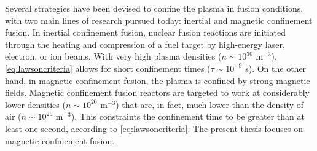 Several strategies have been devised to confine the plasma in fusion conditions, with two main lines of research pursued today: inertial and magnetic confinement fusion.
%
In inertial confinement fusion, nuclear fusion reactions are initiated through the heating and compression of a fuel target by high-energy laser, electron, or ion beams.
%
With very high plasma densities ($n \sim 10^{30}$ m$^{-3}$), \cref{eq:lawsoncriteria} allows for short confinement times ($\tau \sim 10^{-9}$ s).
%
On the other hand, in magnetic confinement fusion, the plasma is confined by strong magnetic fields.
%
Magnetic confinement fusion reactors are targeted to work at considerably lower densities ($n\sim 10^{20}$ m$^{-3}$) that are, in fact, much lower than the density of air ($n \sim 10^{25}$ m$^{-3}$).
%
This constraints the confinement time to be greater than at least one second, according to \cref{eq:lawsoncriteria}.
%
The present thesis focuses on magnetic confinement fusion.

